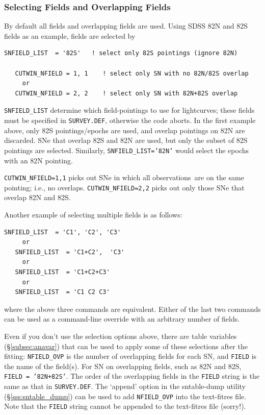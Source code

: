 \documentclass[12pt]{article}
\newcommand{\obss}{observations}
\begin{document}
\subsubsection{Selecting Fields and Overlapping Fields}
%
By default all fields and overlapping fields are used.
Using SDSS 82N and 82S fields as an example,
fields are selected by
%
\begin{Verbatim}[frame=single]
   SNFIELD_LIST  = '82S'   ! select only 82S pointings (ignore 82N)

   CUTWIN_NFIELD = 1, 1    ! select only SN with no 82N/82S overlap
     or
   CUTWIN_NFIELD = 2, 2    ! select only SN with 82N+82S overlap
\end{Verbatim}
%
{\tt SNFIELD\_LIST} determine which field-pointings to 
use for lightcurves; these fields must be specified in 
{\tt SURVEY.DEF}, otherwise the code aborts.
In the first example above, only 82S pointings/epochs
are used, and overlap pointings on 82N are discarded.
SNe that overlap 82S and 82N are used, but only the 
subset of 82S pointings are selected.
Similarly, {\tt SNFIELD\_LIST='82N'} would select the epochs
with an 82N pointing.

{\tt CUTWIN\_NFIELD=1,1} picks out SNe in which all \obss\
are on the same pointing; i.e., no overlaps. 
{\tt CUTWIN\_NFIELD=2,2} picks out only those SNe  that
overlap 82N and 82S.


Another example of selecting multiple fields is as follows:
%
\begin{Verbatim}[frame=single]
   SNFIELD_LIST  = 'C1', 'C2', 'C3'
     or
   SNFIELD_LIST  = 'C1+C2',  'C3'
     or
   SNFIELD_LIST  = 'C1+C2+C3'
     or
   SNFIELD_LIST  = 'C1 C2 C3'
\end{Verbatim}
where the above three commands are equivalent.
Either of the last two commands can be used as a 
command-line override with an arbitrary number of fields.


Even if you don't use the selection options above,
there are table variables (\S\ref{subsec:anavar})
that can be used to apply some of these selections 
after the fitting:
{\tt NFIELD\_OVP} is the number of overlapping fields
for each SN, and {\tt FIELD} is the name of the field(s).
For SN on overlapping fields, such as 82N and 82S, 
{\tt FIELD = '82N+82S'}. The order of the overlapping fields 
in the {\tt FIELD} string is the same as that in {\tt SURVEY.DEF}.
The `append' option in the sntable-dump utility
(\S\ref{sss:sntable_dump}) can be used to add
{\tt NFIELD\_OVP} into the text-fitres file.
Note that the {\tt FIELD} string cannot be appended to the
text-fitres file (sorry!).
 
\end{document}
